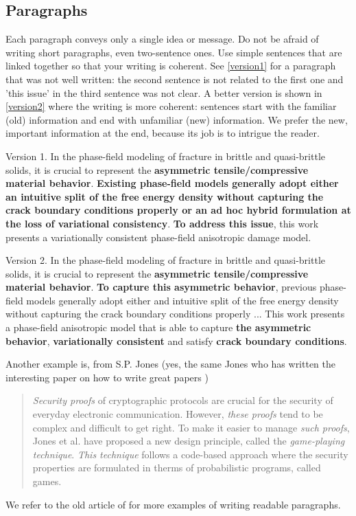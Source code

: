 \documentclass[authoryear,12pta4paper,fleqn]{article}
\numberwithin{equation}{section}
\theoremstyle{remark}
\begin{document}
\subsection{Paragraphs}\label{sec:paragraph}

Each paragraph conveys only a single idea or message. Do not be afraid of writing short paragraphs, even two-sentence ones. 
Use simple sentences that are linked together so that your writing is coherent. 
See \cref{version1} for a paragraph that was not well written: the second sentence is not related to the first one and 'this issue' in the third sentence was not clear. A better version is shown in \cref{version2} where the writing is more coherent: sentences start with the familiar (old) information and end with unfamiliar (new) information. We prefer the new, important information at the end, because its job is to intrigue the reader. 

\begin{MyBox}[width=0.48\textwidth,nobeforeafter,label={version1}]
{Version 1.}
{
In the phase-field modeling of fracture in brittle and quasi-brittle solids, it is crucial to represent the \textbf{asymmetric tensile/compressive material behavior}. \textbf{Existing phase-field models generally adopt either an intuitive split of the free energy density without capturing the crack boundary conditions properly or an ad hoc hybrid formulation at the loss of variational consistency}. \textbf{To address this issue}, this work presents a variationally consistent phase-field anisotropic damage model.}
\end{MyBox}\hfill
\begin{MyBox}[width=0.48\textwidth,nobeforeafter,label={version2}]
{Version 2.}
{
In the phase-field modeling of fracture in brittle and quasi-brittle solids, it is crucial to represent the \textbf{asymmetric tensile/compressive material behavior}. \textbf{To capture this asymmetric behavior}, previous phase-field models  generally adopt either and intuitive split of the free energy density without capturing the crack boundary conditions properly ... This work presents a phase-field anisotropic model that is able to capture \textbf{the asymmetric behavior}, \textbf{variationally consistent} and satisfy \textbf{crack boundary conditions}.}
\end{MyBox}

Another example is, from S.P. Jones (yes, the same Jones who has written the interesting paper on how to write great papers \citep{Jones})
\begin{quote}
\textit{Security proofs} of cryptographic protocols are crucial for the security of everyday electronic communication. However, \textit{these proofs} tend to be complex and difficult to get right. To make it easier to manage \textit{such proofs}, Jones et al. have proposed a new design principle, called the \textit{game-playing technique}. 
\textit{This technique} follows a code-based approach where the security properties are formulated in therms of probabilistic programs, called games.
\end{quote} 
We refer to the old article of \cite{gopen1990science} for more examples of writing readable paragraphs.
\end{document}

